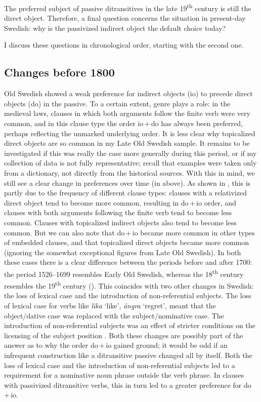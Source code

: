 \documentclass[output=paper]{langscibook}
\begin{document}
The preferred subject of passive ditransitives in the late 19\textsuperscript{th} century is still the direct object. Therefore, a final question concerns the situation in present-day Swedish: why is the passivized indirect object the default choice today?



I discuss these questions in chronological order, starting with the second one.


\subsection{Changes before 1800}\label{sec:falk:5.1}


Old Swedish showed a weak preference for indirect objects (io) to precede direct objects (do) in the passive. To a certain extent, genre plays a role: in the medieval laws, clauses in which both arguments follow the finite verb were very common, and in this clause type the order io\,+\,do has always been preferred, perhaps reflecting the unmarked underlying order. It is less clear why topicalized direct objects are so common in my Late Old Swedish sample. It remains to be investigated if this was really the case more generally during this period, or if my collection of data is not fully representative; recall that examples were taken only from a dictionary, not directly from the historical sources. With this in mind, we still see a clear change in preferences over time (in  above). As shown in , this is partly due to the frequency of different clause types: clauses with a relativized direct object tend to become more common, resulting in do\,+\,io order, and clauses with both arguments following the finite verb tend to become less common. Clauses with topicalized indirect objects also tend to become less common. But we can also note that do\,+\,io became more common in other types of embedded clauses, and that topicalized direct objects became more common (ignoring the somewhat exceptional figures from Late Old Swedish). In both these cases there is a clear difference between the periods before and after 1700: the period 1526–1699 resembles Early Old Swedish, whereas the 18\textsuperscript{th} century resembles the 19\textsuperscript{th} century (). This coincides with two other changes in Swedish: the loss of lexical case and the introduction of non-referential subjects. The loss of lexical case for verbs like \textit{lika} ‘like’, \textit{ångra} ‘regret’, meant that the object/dative case was replaced with the subject/nominative case. The introduction of non-referential subjects was an effect of stricter conditions on the licensing of the subject position \citep{Falk1993}. Both these changes are possibly part of the answer as to why the order do\,+\,io gained ground; it would be odd if an infrequent construction like a ditransitive passive changed all by itself. Both the loss of lexical case and the introduction of non-referential subjects led to a requirement for a nominative noun phrase outside the verb phrase. In clauses with passivized ditransitive verbs, this in turn led to a greater preference for do\,+\,io.
\end{document}
